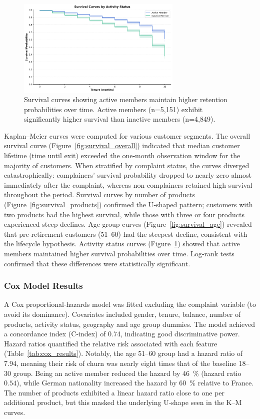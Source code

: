 \documentclass[12pt]{article}
\begin{document}
\begin{figure}[H]
\centering
\includegraphics[width=0.7\textwidth]{img/12_survival_active_status_plot.png}
\caption{Survival curves showing active members maintain higher retention probabilities over time. Active members (n=5,151) exhibit significantly higher survival than inactive members (n=4,849).}
\label{fig:survival_active}
\end{figure}

Kaplan–Meier curves were computed for various customer segments.  The overall survival curve (Figure~\ref{fig:survival_overall}) indicated that median customer lifetime (time until exit) exceeded the one‑month observation window for the majority of customers.  When stratified by complaint status, the curves diverged catastrophically: complainers' survival probability dropped to nearly zero almost immediately after the complaint, whereas non‑complainers retained high survival throughout the period.  Survival curves by number of products (Figure~\ref{fig:survival_products}) confirmed the U‑shaped pattern; customers with two products had the highest survival, while those with three or four products experienced steep declines.  Age group curves (Figure~\ref{fig:survival_age}) revealed that pre‑retirement customers (51–60) had the steepest decline, consistent with the lifecycle hypothesis.  Activity status curves (Figure~\ref{fig:survival_active}) showed that active members maintained higher survival probabilities over time.  Log‑rank tests confirmed that these differences were statistically significant.

\subsubsection{Cox Model Results}
A Cox proportional‑hazards model was fitted excluding the complaint variable (to avoid its dominance).  Covariates included gender, tenure, balance, number of products, activity status, geography and age group dummies.  The model achieved a concordance index (C‑index) of 0.74, indicating good discriminative power.  Hazard ratios quantified the relative risk associated with each feature (Table~\ref{tab:cox_results}).  Notably, the age 51–60 group had a hazard ratio of 7.94, meaning their risk of churn was nearly eight times that of the baseline 18–30 group.  Being an active member reduced the hazard by 46~\% (hazard ratio \(0.54\)), while German nationality increased the hazard by 60~\% relative to France.  The number of products exhibited a linear hazard ratio close to one per additional product, but this masked the underlying U‑shape seen in the K–M curves.
\end{document}
